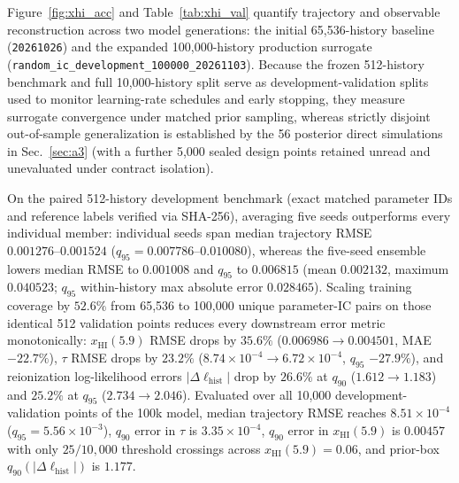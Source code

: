 \documentclass[aps,prd,reprint,superscriptaddress,nofootinbib,amsmath,amssymb,floatfix,longbibliography]{revtex4-2}
\begin{document}
Figure~\ref{fig:xhi_acc} and Table~\ref{tab:xhi_val} quantify trajectory and observable reconstruction across two model generations: the initial 65,536-history baseline (\texttt{20261026}) and the expanded 100,000-history production surrogate (\texttt{random\_ic\_development\_100000\_20261103}). Because the frozen 512-history benchmark and full 10,000-history split serve as development-validation splits used to monitor learning-rate schedules and early stopping, they measure surrogate convergence under matched prior sampling, whereas strictly disjoint out-of-sample generalization is established by the 56 posterior direct simulations in Sec.~\ref{sec:a3} (with a further 5,000 sealed design points retained unread and unevaluated under contract isolation).

On the paired 512-history development benchmark (exact matched parameter IDs and reference labels verified via SHA-256), averaging five seeds outperforms every individual member: individual seeds span median trajectory RMSE $0.001276\text{--}0.001524$ ($q_{95} = 0.007786\text{--}0.010080$), whereas the five-seed ensemble lowers median RMSE to $0.001008$ and $q_{95}$ to $0.006815$ (mean $0.002132$, maximum $0.040523$; $q_{95}$ within-history max absolute error $0.028465$). Scaling training coverage by $52.6\%$ from 65,536 to 100,000 unique parameter-IC pairs on those identical 512 validation points reduces every downstream error metric monotonically: $x_{\mathrm{HI}}(5.9)$ RMSE drops by $35.6\%$ ($0.006986 \to 0.004501$, MAE $-22.7\%$), $\tau$ RMSE drops by $23.2\%$ ($8.74\times 10^{-4} \to 6.72\times 10^{-4}$, $q_{95}$ $-27.9\%$), and reionization log-likelihood errors $|\Delta\ell_{\mathrm{hist}}|$ drop by $26.6\%$ at $q_{90}$ ($1.612 \to 1.183$) and $25.2\%$ at $q_{95}$ ($2.734 \to 2.046$). Evaluated over all 10,000 development-validation points of the 100k model, median trajectory RMSE reaches $8.51\times 10^{-4}$ ($q_{95} = 5.56\times 10^{-3}$), $q_{90}$ error in $\tau$ is $3.35\times 10^{-4}$, $q_{90}$ error in $x_{\mathrm{HI}}(5.9)$ is $0.00457$ with only $25/10{,}000$ threshold crossings across $x_{\mathrm{HI}}(5.9)=0.06$, and prior-box $q_{90}(|\Delta\ell_{\mathrm{hist}}|)$ is $1.177$.
\end{document}
